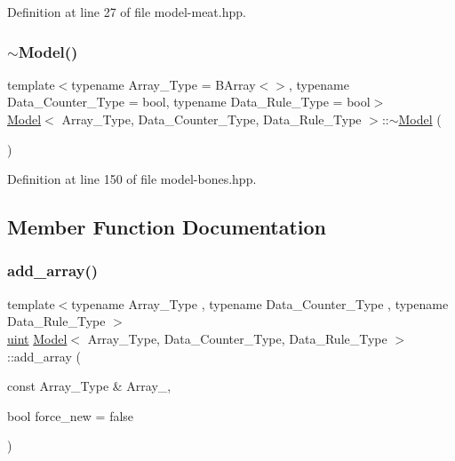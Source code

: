 Definition at line 27 of file model-\/meat.\+hpp.

\mbox{\label{class_model_a0eba131af14e1ceefc7748323e9fb4bf}} 
\subsubsection{\texorpdfstring{$\sim$\+Model()}{~Model()}}
{\footnotesize\ttfamily template$<$typename Array\+\_\+\+Type  = B\+Array$<$$>$, typename Data\+\_\+\+Counter\+\_\+\+Type  = bool, typename Data\+\_\+\+Rule\+\_\+\+Type  = bool$>$ \\
\hyperlink{class_model}{Model}$<$ Array\+\_\+\+Type, Data\+\_\+\+Counter\+\_\+\+Type, Data\+\_\+\+Rule\+\_\+\+Type $>$\+::$\sim$\hyperlink{class_model}{Model} (\begin{DoxyParamCaption}{ }\end{DoxyParamCaption})\hspace{0.3cm}{\ttfamily [inline]}}



Definition at line 150 of file model-\/bones.\+hpp.



\subsection{Member Function Documentation}
\mbox{\label{class_model_a17a2205b52c03bb29eefb8fb126a01f6}} 
\subsubsection{\texorpdfstring{add\+\_\+array()}{add\_array()}}
{\footnotesize\ttfamily template$<$typename Array\+\_\+\+Type , typename Data\+\_\+\+Counter\+\_\+\+Type , typename Data\+\_\+\+Rule\+\_\+\+Type $>$ \\
\hyperlink{typedefs_8hpp_a91ad9478d81a7aaf2593e8d9c3d06a14}{uint} \hyperlink{class_model}{Model}$<$ Array\+\_\+\+Type, Data\+\_\+\+Counter\+\_\+\+Type, Data\+\_\+\+Rule\+\_\+\+Type $>$\+::add\+\_\+array (\begin{DoxyParamCaption}\item[{const Array\+\_\+\+Type \&}]{Array\+\_\+,  }\item[{bool}]{force\+\_\+new = {\ttfamily false} }\end{DoxyParamCaption})\hspace{0.3cm}{\ttfamily [inline]}}



